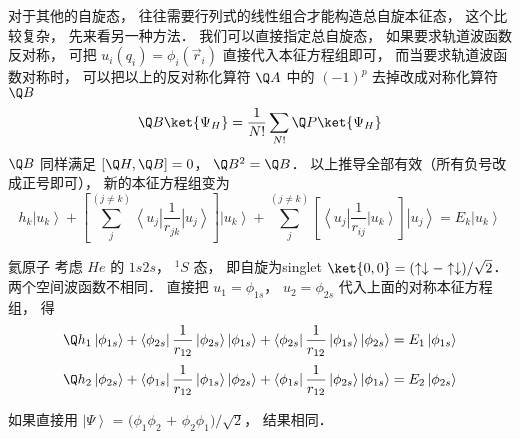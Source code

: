 对于其他的自旋态， 往往需要行列式的线性组合才能构造总自旋本征态， 这个比较复杂， 先来看另一种方法． 我们可以直接指定总自旋态， 如果要求轨道波函数反对称， 可把 ${u_i}({q_i}) = {\phi _i}({\vec r_i})$ 直接代入本征方程组即可， 而当要求轨道波函数对称时， 可以把以上的反对称化算符 $\Q A$ 中的 ${( - 1)^p}$ 去掉改成对称化算符 $\Q B$ 
 \begin{equation}
\Q B \ket{{\Psi _H}}  = \frac{1}{{N!}}\sum\limits_{N!} {\Q P\ket{{\Psi _H}} } 
\end{equation}
 $\Q B$ 同样满足 $[\Q H,\Q B] = 0$，  ${\Q B^2} = \Q B$．  以上推导全部有效（所有负号改成正号即可）， 新的本征方程组变为
 \begin{equation}
{h_k}\left| {{u_k}} \right\rangle  + \left[ {\sum\limits_j^{(j \ne k)} {\left\langle {{u_j}} \right|\frac{1}{{{r_{jk}}}}\left| {{u_j}} \right\rangle } } \right]\left| {{u_k}} \right\rangle  + \sum\limits_j^{(j \ne k)} {\left[ {\left\langle {{u_j}} \right|\frac{1}{{{r_{ij}}}}\left| {{u_k}} \right\rangle } \right]\left| {{u_j}} \right\rangle }  = {E_k}\left| {{u_k}} \right\rangle 
\end{equation}

\begin{exam}{氦原子}
考虑 $He$ 的 $1s2s$，  $^1S$ 态， 即自旋为singlet $\ket{0,0}  = ( \uparrow  \downarrow  -  \uparrow  \downarrow )/\sqrt 2 $．  两个空间波函数不相同． 直接把 ${u_1} = {\phi _{1s}}$，  ${u_2} = {\phi _{2s}}$ 代入上面的对称本征方程组， 得
 \begin{equation}
{\Q h_1}\left| {{\phi _{1s}}} \right\rangle  + \left\langle {{\phi _{2s}}} \right|\frac{1}{{{r_{12}}}}\left| {{\phi _{2s}}} \right\rangle \left| {{\phi _{1s}}} \right\rangle  + \left\langle {{\phi _{2s}}} \right|\frac{1}{{{r_{12}}}}\left| {{\phi _{1s}}} \right\rangle \left| {{\phi _{2s}}} \right\rangle  = {E_1}\left| {{\phi _{1s}}} \right\rangle 
\end{equation}
\begin{equation}
{\Q h_2}\left| {{\phi _{2s}}} \right\rangle  + \left\langle {{\phi _{1s}}} \right|\frac{1}{{{r_{12}}}}\left| {{\phi _{1s}}} \right\rangle \left| {{\phi _{2s}}} \right\rangle  + \left\langle {{\phi _{1s}}} \right|\frac{1}{{{r_{12}}}}\left| {{\phi _{2s}}} \right\rangle \left| {{\phi _{1s}}} \right\rangle  = {E_2}\left| {{\phi _{2s}}} \right\rangle 
\end{equation}
 
如果直接用 $\left| \Psi  \right\rangle {\text{ = (}}{\phi _1}{\phi _2}{\text{ + }}{\phi _2}{\phi _1}{\text{)/}}\sqrt 2 $，  结果相同．
\end{exam}
 

